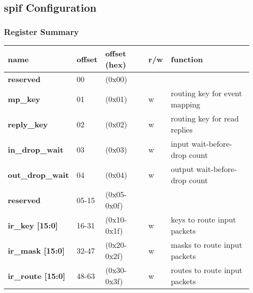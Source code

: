 \documentclass[11pt,a4paper,twoside]{article}
\begin{document}
\clearpage
\subsection{spif Configuration}


\subsubsection*{Register Summary}

\begin{center}
\begin{table}[!h]
	\begin{tabularx}{\textwidth}{| p{34mm} p{13mm} p{21mm} p{7mm} X |}
		\hline
		\textbf{name} & \textbf{offset} & \textbf{offset} (hex) & \textbf{r/w} & \textbf{function} \\%
		\hline
		\hline
		\cellcolor{gray!25}\textbf{reserved} & \cellcolor{gray!25}00      & \cellcolor{gray!25}(0x00)      & \cellcolor{gray!25} & \cellcolor{gray!25}\\%
		\textbf{mp\_key}                     & 01                         & (0x01)                         & w                   & routing key for event mapping \\%
		\textbf{reply\_key}                  & 02                         & (0x02)                         & w                   & routing key for read replies \\%
		\textbf{in\_drop\_wait}              & 03                         & (0x03)                         & w                   & input wait-before-drop count \\%
		\textbf{out\_drop\_wait}             & 04                         & (0x04)                         & w                   & output wait-before-drop count \\%
		\cellcolor{gray!25}\textbf{reserved} & \cellcolor{gray!25}05-15   & \cellcolor{gray!25}(0x05-0x0f) & \cellcolor{gray!25} & \cellcolor{gray!25}\\%
		\textbf{ir\_key [15:0]}              & 16-31                      & (0x10-0x1f)                    & w                   & keys to route input packets \\%
		\textbf{ir\_mask [15:0]}             & 32-47                      & (0x20-0x2f)                    & w                   & masks to route input packets \\%
		\textbf{ir\_route [15:0]}            & 48-63                      & (0x30-0x3f)                    & w                   & routes to route input packets \\%

\end{tabularx}
\end{table}
\end{center}
\end{document}
